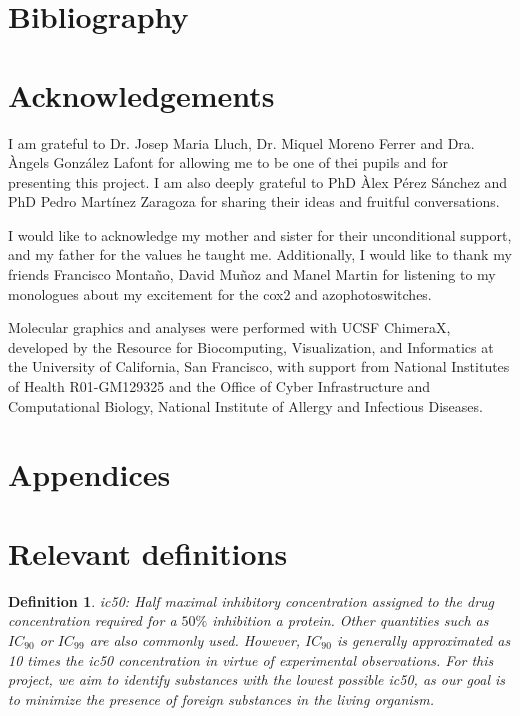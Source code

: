 \documentclass[11pt]{article}
\newtheorem{definition}{Definition}
\begin{document}
\newpage
\section{Bibliography}
\printbibliography[title = { \vspace{-1cm}}]

\newpage
\section{Acknowledgements}
\hspace{0.55cm}I am grateful to Dr. Josep Maria Lluch, Dr. Miquel Moreno Ferrer and Dra. Àngels González Lafont for allowing me to be one of thei pupils and for presenting this project. I am also deeply grateful to PhD Àlex Pérez Sánchez and PhD Pedro Martínez Zaragoza for sharing their ideas and fruitful conversations.

I would like to acknowledge my mother and sister for their unconditional support, and my father for the values he taught me. Additionally, I would like to thank my friends Francisco Montaño, David Muñoz and Manel Martin for listening to my monologues about my excitement for the \gls{cox2} and azophotoswitches.

Molecular graphics and analyses were performed with UCSF ChimeraX, developed by the Resource for Biocomputing, Visualization, and Informatics at the University of California, San Francisco, with support from National Institutes of Health R01-GM129325 and the Office of Cyber Infrastructure and Computational Biology, National Institute of Allergy and Infectious Diseases.


\newpage
\thispagestyle{empty}
\mbox{} 
\newpage
\appendix
\section*{\huge Appendices}
\section{Relevant definitions}\label{appendixRelevantDefinitions}
\begin{definition}\label{definitionIC50}
\gls{ic50}: Half maximal inhibitory concentration assigned to the drug concentration required for a $50\%$ inhibition a protein. Other quantities such as $IC_{90}$ or $IC_{99}$ are also commonly used. However, $IC_{90}$ is generally approximated as 10 times the \gls{ic50} concentration in virtue of experimental observations\cite{BookIC50}. For this project, we aim to identify substances with the lowest possible \gls{ic50}, as our goal is to minimize the presence of foreign substances in the living organism.
\end{definition}
\end{document}
